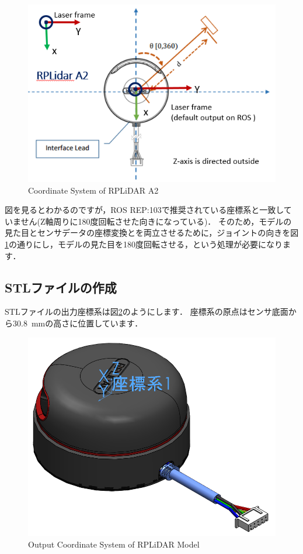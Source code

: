 \documentclass[{../../master}]{subfiles}
\begin{document}
\begin{figure}[ht]
  \centering
  \includegraphics[width=100truemm]{images/rplidar_a2_coordinate_system.png}
  \caption{Coordinate System of RPLiDAR A2}
  \label{fig:rplidar_a2_coordinate_system}
\end{figure}

図を見るとわかるのですが，ROS REP:103で推奨されている座標系と一致していません(Z軸周りに180度回転させた向きになっている)．
そのため，モデルの見た目とセンサデータの座標変換とを両立させるために，ジョイントの向きを図\ref{fig:rplidar_a2_coordinate_system}の通りにし，モデルの見た目を180度回転させる，という処理が必要になります．

\subsection{STLファイルの作成}

STLファイルの出力座標系は図\ref{fig:lidar_link_coordinate}のようにします．
座標系の原点はセンサ底面から\SI{30.8}{mm}の高さに位置しています．

\begin{figure}[ht]
  \centering
  \includegraphics[height=40truemm]{images/lidar_link_coordinate.png}
  \caption{Output Coordinate System of RPLiDAR Model}
  \label{fig:lidar_link_coordinate}
\end{figure}
\end{document}
